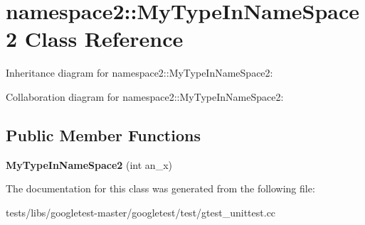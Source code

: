 \hypertarget{classnamespace2_1_1MyTypeInNameSpace2}{}\section{namespace2\+:\+:My\+Type\+In\+Name\+Space2 Class Reference}
\label{classnamespace2_1_1MyTypeInNameSpace2}


Inheritance diagram for namespace2\+:\+:My\+Type\+In\+Name\+Space2\+:


Collaboration diagram for namespace2\+:\+:My\+Type\+In\+Name\+Space2\+:
\subsection*{Public Member Functions}
\begin{DoxyCompactItemize}
\item 
\mbox{\label{classnamespace2_1_1MyTypeInNameSpace2_a033025628289dbf29022b2bfbe66f53e}} 
{\bfseries My\+Type\+In\+Name\+Space2} (int an\+\_\+x)
\end{DoxyCompactItemize}


The documentation for this class was generated from the following file\+:\begin{DoxyCompactItemize}
\item 
tests/libs/googletest-\/master/googletest/test/gtest\+\_\+unittest.\+cc\end{DoxyCompactItemize}
